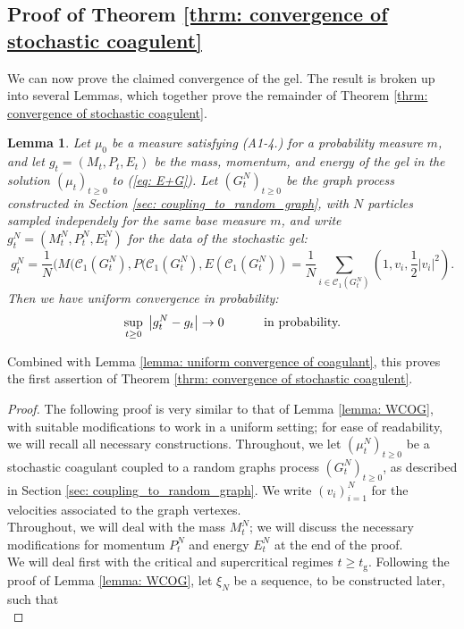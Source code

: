 \documentclass[11pt, notitlepage]{article}
\newtheorem{lem}[thm]{Lemma}
\begin{document}
  \subsection{\textbf{Proof of Theorem \ref{thrm: convergence of stochastic coagulent}}}
   We can now prove the claimed convergence of the gel. The result is broken up into several Lemmas, which together prove the remainder of Theorem \ref{thrm: convergence of stochastic coagulent}.
  \begin{lem}\label{lemma: COG} Let $\mu_0$ be a measure satisfying ({A1}-{4}.) for a probability measure $m$, and let $g_t=(M_t,P_t,E_t)$ be the mass, momentum, and energy of the gel in the solution $(\mu_t)_{t\ge 0}$ to (\ref{eq: E+G}). Let $(G^N_t)_{t\ge 0}$ be the graph process constructed in Section \ref{sec: coupling_to_random_graph}, with $N$ particles sampled independely for the same base measure $m$, and write $g^N_t=(M^N_t, P^N_t, E^N_t)$ for the data of the stochastic gel: \begin{equation} g^N_t=\frac{1}{N}(M(\mathcal{C}_1(G^N_t),P(\mathcal{C}_1(G^N_t),E(\mathcal{C}_1(G^N_t))=\frac{1}{N}\sum_{i \in \mathcal{C}_1(G^N_t)} \left(1,v_i,\frac{1}{2}|v_i|^2\right). \end{equation} Then we have uniform convergence in probability: \begin{equation} \sup_{t\ge 0}\hspace{0.1cm}\left|g^N_t-g_t\right|\rightarrow 0 \hspace{1cm}\text{ in probability.}\end{equation}  \end{lem} Combined with Lemma \ref{lemma: uniform convergence of coagulant}, this proves the first assertion of Theorem \ref{thrm: convergence of stochastic coagulent}. \begin{proof} The following proof is very similar to that of Lemma \ref{lemma: WCOG}, with suitable modifications to work in a uniform setting; for ease of readability, we will recall all necessary constructions.   Throughout, we let $(\mu^N_t)_{t\geq 0}$ be a stochastic coagulant coupled to a random graphs process $(G^N_t)_{t\geq 0}$, as described in Section \ref{sec: coupling_to_random_graph}. We write $(v_i)_{i=1}^N$ for the velocities associated to the graph vertexes. \medskip \\ Throughout, we will deal with the mass $M^N_t$; we will discuss the necessary modifications for momentum $P^N_t$ and energy $E^N_t$ at the end of the proof. \medskip \\ We will deal first with the critical and supercritical regimes $t\ge t_\mathrm{g}$. Following the proof of Lemma \ref{lemma: WCOG}, let $\xi_N$ be a sequence, to be constructed later, such that \begin{equation}\label{eq: choice of xiN}

\end{equation}
\end{proof}
\end{document}
